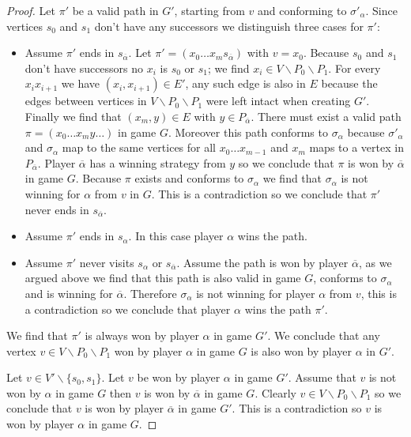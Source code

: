 \begin{lemma}
\begin{proof}
		Let $\pi'$ be a valid path in $G'$, starting from $v$ and conforming to $\sigma'_\alpha$. Since vertices $s_0$ and $s_1$ don't have any successors we distinguish three cases for $\pi'$:
		\begin{itemize}
			\item Assume $\pi'$ ends in $s_{\overline{\alpha}}$. Let $\pi' = (x_0\dots x_m s_{\overline{\alpha}})$ with $v = x_0$. Because $s_0$ and $s_1$ don't have successors no $x_i$ is $s_0$ or $s_1$; we find $x_i \in V\backslash P_0 \backslash P_1$. For every $x_ix_{i+1}$ we have $(x_i,x_{i+1}) \in E'$, any such edge is also in $E$ because the edges between vertices in $V\backslash P_0 \backslash P_1$ were left intact when creating $G'$. Finally we find that $(x_m,y) \in E$ with $y \in P_{\overline{\alpha}}$. There must exist a valid path $\pi = (x_0 \dots x_m y\dots)$ in game $G$. Moreover this path conforms to $\sigma_\alpha$ because $\sigma'_\alpha$ and $\sigma_\alpha$ map to the same vertices for all $x_0\dots x_{m-1}$ and $x_m$ maps to a vertex in $P_{\overline{\alpha}}$. Player $\overline{\alpha}$ has a winning strategy from $y$ so we conclude that $\pi$ is won by $\overline{\alpha}$ in game $G$. Because $\pi$ exists and conforms to $\sigma_\alpha$ we find that $\sigma_\alpha$ is not winning for $\alpha$ from $v$ in $G$. This is a contradiction so we conclude that $\pi'$ never ends in $s_{\overline{\alpha}}$.
			\item Assume $\pi'$ ends in $s_\alpha$. In this case player $\alpha$ wins the path.
			\item Assume $\pi'$ never visits $s_\alpha$ or $s_{\overline{\alpha}}$. Assume the path is won by player $\overline{\alpha}$, as we argued above we find that this path is also valid in game $G$, conforms to $\sigma_\alpha$ and is winning for $\overline{\alpha}$. Therefore $\sigma_\alpha$ is not winning for player $\alpha$ from $v$, this is a contradiction so we conclude that player ${\alpha}$ wins the path $\pi'$.
		\end{itemize}
		We find that $\pi'$ is always won by player $\alpha$ in game $G'$. We conclude that any vertex $v \in V \backslash P_0 \backslash P_1$ won by player $\alpha$ in game $G$ is also won by player $\alpha$ in $G'$. 
		
		Let $v \in V'\backslash \{s_0,s_1\}$. Let $v$ be won by player $\alpha$ in game $G'$. Assume that $v$ is not won by $\alpha$ in game $G$ then $v$ is won by $\overline{\alpha}$ in game $G$. Clearly $v \in V \backslash P_0 \backslash P_1$ so we conclude that $v$ is won by player $\overline{\alpha}$ in game $G'$. This is a contradiction so $v$ is won by player $\alpha$ in game $G$.
	\end{proof}
\end{lemma}

